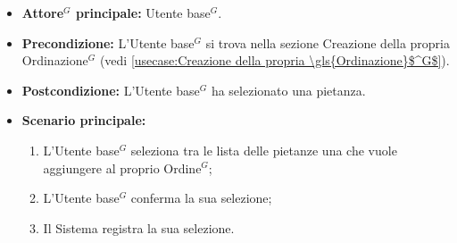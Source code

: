 \label{usecase:Seleziona pietanza}
\begin{itemize}
	\item \textbf{\gls{Attore}$^G$ principale:} \gls{Utente base}$^G$.

	\item \textbf{Precondizione:} L'\gls{Utente base}$^G$ si trova nella sezione Creazione della propria \gls{Ordinazione}$^G$ (vedi \autoref{usecase:Creazione della propria \gls{Ordinazione}$^G$}).

	\item \textbf{Postcondizione:} L'\gls{Utente base}$^G$ ha selezionato una pietanza.

	\item \textbf{Scenario principale:}
	      \begin{enumerate}
		      \item L'\gls{Utente base}$^G$ seleziona tra le lista delle pietanze una che vuole aggiungere al proprio \gls{Ordine}$^G$;
		      \item L'\gls{Utente base}$^G$ conferma la sua selezione;
		      \item Il Sistema registra la sua selezione.
	      \end{enumerate}
\end{itemize}

